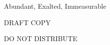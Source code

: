 \thispagestyle{empty}

\vspace*{1.75in}
{\center\Large

{\titlefont
Abundant, Exalted, Immeasurable
}


\mbox{}

DRAFT COPY

\mbox{}

DO NOT DISTRIBUTE

}

\clearpage
